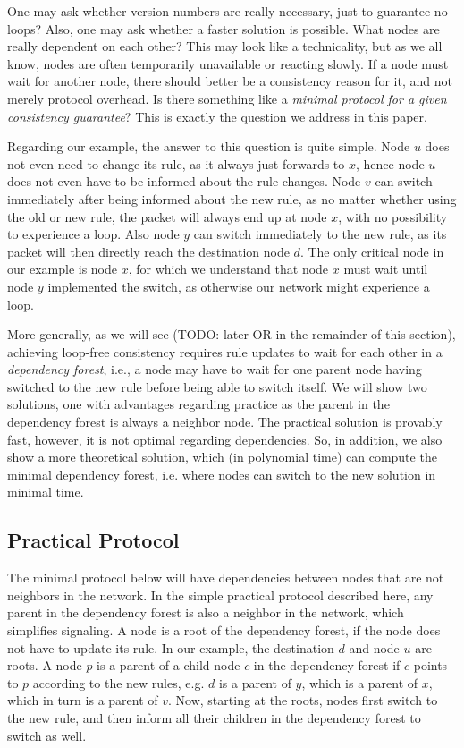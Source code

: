 One may ask whether version numbers are really necessary, just to guarantee no loops? Also, one may ask whether a faster solution is possible. What nodes are really dependent on each other? This may look like a technicality, but as we all know, nodes are often temporarily unavailable or reacting slowly. If a node must wait for another node, there should better be a consistency reason for it, and not merely protocol overhead. Is there something like a \emph{minimal protocol for a given consistency guarantee}? This is exactly the question we address in this paper.

Regarding our example, the answer to this question is quite simple. Node $u$ does not even need to change its rule, as it always just forwards to $x$, hence node $u$ does not even have to be informed about the rule changes. Node $v$ can switch immediately after being informed about the new rule, as no matter whether using the old or new rule, the packet will always end up at node $x$, with no possibility to experience a loop. Also node $y$ can switch immediately to the new rule, as its packet will then directly reach the destination node $d$. The only critical node in our example is node $x$, for which we understand that node $x$ must wait until node $y$ implemented the switch, as otherwise our network might experience a loop.

More generally, as we will see (TODO: later OR in the remainder of this section), achieving loop-free consistency requires rule updates to wait for each other in a \emph{dependency forest}, i.e., a node may have to wait for one parent node having switched to the new rule before being able to switch itself. We will show two solutions, one with advantages regarding practice as the parent in the dependency forest is always a neighbor node. The practical solution is provably fast, however, it is not optimal regarding dependencies. So, in addition, we also show a more theoretical solution, which (in polynomial time) can compute the minimal dependency forest, i.e. where nodes can switch to the new solution in minimal time.

\subsection{Practical Protocol}
\label{sec:practical}

The minimal protocol below will have dependencies between nodes that are not neighbors in the network. In the simple practical protocol described here, any parent in the dependency forest is also a neighbor in the network, which simplifies signaling. A node is a root of the dependency forest, if the node does not have to update its rule. In our example, the destination $d$ and node $u$ are roots. A node $p$ is a parent of a child node $c$ in the dependency forest if $c$ points to $p$ according to the new rules, e.g. $d$ is a parent of $y$, which is a parent of $x$, which in turn is a parent of $v$. Now, starting at the roots, nodes first switch to the new rule, and then inform all their children in the dependency forest to switch as well.

